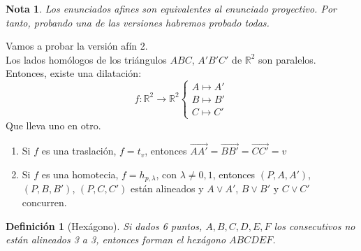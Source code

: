 \documentclass[11pt, a4paper]{article}
\makeatletter
\newif\IfInSansMode
\let\oldsf\sffamily
\renewcommand*{\sffamily}{\oldsf\mathversion{sans}\InSansModetrue}
\let\oldnorm\normalfont
\renewcommand*{\normalfont}{\oldnorm\InSansModefalse\mathversion{normal}}
\renewenvironment{proof}[1][\proofname] {\vspace{-15pt}\par\pushQED{\qed}\normalfont\topsep6\p@\@plus6\p@\relax\trivlist\item[\hskip\labelsep\it#1\@addpunct{.}]\ignorespaces}{\popQED\endtrivlist\@endpefalse}
\newcommand{\R}{\mathbb{R}}
\renewcommand{\vec}{\overrightarrow}
\renewenvironment{proof}[1][\proofname] {\par\pushQED{\qed}\normalfont\topsep6\p@\@plus6\p@\relax\trivlist\item[\hskip\labelsep\itshape\sffamily#1\@addpunct{.}]\ignorespaces}{\popQED\endtrivlist\@endpefalse}
\theoremstyle{theorem-style}
\theoremstyle{definition-style}
\newtheorem{ndef}{Definición}[section]
\theoremstyle{remark-style}
\newtheorem*{nota}{Nota}
\theoremstyle{example-style}
\makeatother
\begin{document}
\begin{nota}
	Los enunciados afines son equivalentes al enunciado proyectivo. Por tanto, probando una de las versiones habremos probado todas.
\end{nota}
\begin{proof}
	Vamos a probar la versión afín 2.\\
	Los lados homólogos de los triángulos $ABC$, $A'B'C'$ de $\R^2$ son paralelos. Entonces, existe una dilatación:
	\[
	f: \R^2 \to \R^2 \begin{cases}
	A \mapsto A'\\
	B \mapsto B'\\
	C \mapsto C'
	
\end{cases}
	\]
	Que lleva uno en otro.
	\begin{enumerate}
	\item Si $f$ es una traslación, $f = t_v$, entonces $\vec{AA'}= \vec{BB'} = \vec{CC'}=v$
	\item Si $f$ es una homotecia, $f= h_{p,\lambda}$, con $\lambda \ne 0, 1$, entonces $(P,A,A')$, $(P,B,B')$, $(P,C,C')$ están alineados y $A\vee A'$, $B \vee B'$ y $C \vee C'$ concurren.
\end{enumerate}
\end{proof}

\begin{ndef}[Hexágono]
    Si dados 6 puntos, $A,B,C,D,E,F$ los consecutivos no están alineados 3 a 3, entonces forman el hexágono $ABCDEF$.
\end{ndef}
\end{document}

